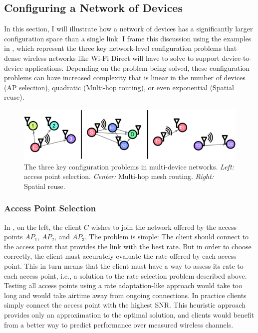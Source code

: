 \subsection{Configuring a Network of Devices}
\label{sec:intro_network_problems}
In this section, I will illustrate how a network of devices has a significantly larger configuration space than a single link. I frame this discussion using the examples in , which represent the three key network-level configuration problems that dense wireless networks like Wi-Fi Direct will have to solve to support device-to-device applications. Depending on the problem being solved, these configuration problems can have increased complexity that is linear in the number of devices (AP selection), quadratic (Multi-hop routing), or even exponential (Spatial reuse).

\begin{figure}[tp]
	\centering
	\includegraphics[width=\textwidth]{figures/introduction/network.pdf}
	\caption[The three key configuration problems in multi-device networks]{\label{fig:network_examples} The three key configuration problems in multi-device networks. \textit{Left:} access point selection. \textit{Center:} Multi-hop mesh routing. \textit{Right:} Spatial reuse. }
\end{figure}

\subsubsection{Access Point Selection}
In , on the left, the client $C$ wishes to join the network offered by the access points $AP_1$, $AP_2$, and $AP_3$. The  problem is simple: The client should connect to the access point that provides the link with the best rate. But in order to choose correctly, the client must accurately evaluate the rate offered by each access point. This in turn means that the client must have a way to assess its rate to each access point, i.e., a solution to the rate selection problem described above. Testing all access points using a rate adaptation-like approach would take too long and would take airtime away from ongoing connections. In practice clients simply connect the access point with the highest SNR\@. This heuristic approach provides only an approximation to the optimal solution, and clients would benefit from a better way to predict performance over measured wireless channels.

